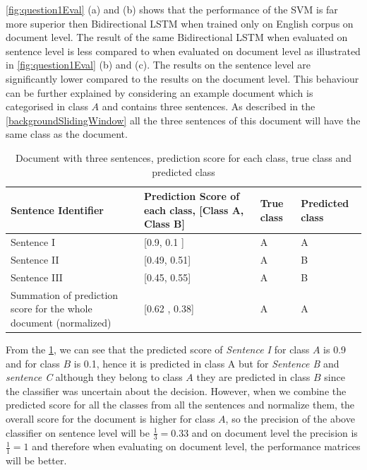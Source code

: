 \ref{fig:question1Eval} (a) and (b) shows that the performance of the SVM is far more superior then Bidirectional LSTM when trained only on English corpus on document level. The result of the same Bidirectional LSTM when evaluated on sentence level is less compared to when evaluated on document level as illustrated in \ref{fig:question1Eval} (b) and (c). The results on the sentence level are significantly lower compared to the results on the document level. This behaviour can be further explained by considering an example document which is categorised in class $A$ and contains three sentences. As described in the \ref{backgroundSlidingWindow} all the three sentences of this document will have the same class as the document.
\begin{table}[!ht]
\centering
\begin{tabular}{>{\centering\arraybackslash}m{3cm}>{\centering\arraybackslash}m{3cm}>{\centering\arraybackslash}m{3cm}>{\centering\arraybackslash}m{3cm}}
\hline
\textbf{Sentence Identifier} & \textbf{Prediction Score of each class, [Class A, Class B]} & \textbf{True class} & \textbf{Predicted class} \\ \hline
Sentence I & {[}0.9, 0.1 {]} & A & A \\[0.2cm]
Sentence II & {[}0.49, 0.51{]} & A & B \\[0.2cm]
Sentence III & {[}0.45, 0.55{]} & A & B \\ [0.2cm]\hline
Summation of prediction score for the whole document (normalized) & {[}0.62 , 0.38{]} & A & A
\end{tabular}
\caption{Document with three sentences, prediction score for each class, true class and predicted class}
\label{table:SentVsDoc}
\end{table}

From the \ref{table:SentVsDoc}, we can see that the predicted score of \textit{Sentence I} for class $A$ is 0.9 and for class $B$ is 0.1, hence it is predicted in class A  but for \textit{Sentence B} and \textit{sentence C} although they belong to class $A$ they are predicted in class $B$ since the classifier was uncertain about the decision. However, when we combine the predicted score for all the classes from all the sentences and normalize them, the overall score for the document is higher for class $A$, so the precision of the above classifier on sentence level will be $\frac{1}{3} = 0.33$ and on document level the precision is $\frac{1}{1} = 1$ and therefore when evaluating on document level, the performance matrices will be better. 


